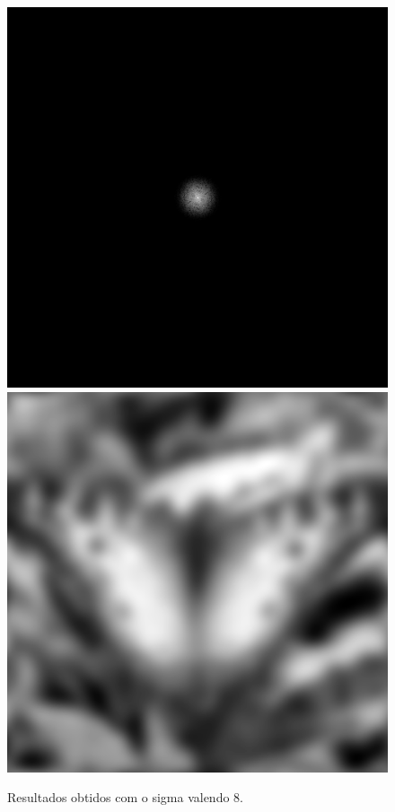 \documentclass[twoside,twocolumn]{article}
\begin{document}
\begin{figure}[H]
\begin{center}
	\includegraphics[scale=.19]{figures/butterfly_mag_filter_8.png}
	\includegraphics[scale=.19]{figures/butterfly_result_8.png}
\caption{Resultados obtidos com o sigma valendo 8.} \label{mag_64}
\end{center}
\end{figure}
\end{document}

